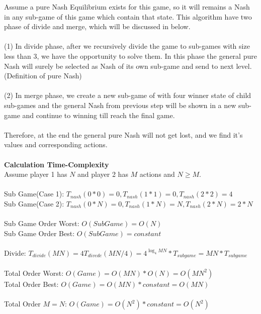 \documentclass[
  course = {{IE579 Game Theory and Multi-Agent Reinforcement Learning}},
  quartile = {{4}},
  assignment = 2,
  name = {{Mohammad Mahdi Rahimi}},
  studentnumber = {{20208244}},
  email = {{mahi@kaist.ac.kr}},
  firstexercise = 1
]{aga-homework}
\begin{document}
\proof Assume a pure Nash Equilibrium exists for this game, so it will remains a Nash in any sub-game of this game which contain that state. This algorithm have two phase of divide and merge, which will be discussed in below.\\\\
(1) In divide phase, after we recursively divide the game to sub-games with size less than 3, we have the opportunity to solve them. In this phase the general pure Nash will surely be selected as Nash of its own sub-game and send to next level. (Definition of pure Nash)
\\\\
(2) In merge phase, we create a new sub-game of with four winner state of child sub-games and the general Nash from previous step will be shown in a new sub-game and continue to winning till reach the final game.
\\\\
Therefore, at the end the general pure Nash will not get lost, and we find it's values and corresponding actions.
\\\\
\textbf{Calculation Time-Complexity}\\
Assume player 1 has $N$ and player 2 has $M$ actions and $N \ge M$.\\\\
Sub Game(Case 1): $T_{nash}(0*0) = 0, T_{nash}(1*1) = 0, T_{nash}(2*2) = 4$\\
Sub Game(Case 2): $T_{nash}(0*N) = 0, T_{nash}(1*N) = N, T_{nash}(2*N) = 2*N$\\
\\
Sub Game Order Worst: $O(SubGame) = O(N)$\\
Sub Game Order Best: $O(SubGame) = constant $\\\\
Divide: $T_{divide}(MN) = 4T_{divede}(MN/4) = 4^{\log_4{MN}}*T_{subgame} = MN*T_{subgame}$\\\\
Total Order Worst: $O(Game) =  O(MN) * O(N) = O(MN^2)$\\
Total Order Best: $O(Game) = O(MN) * constant = O(MN)$\\\\
Total Order $M = N$: $O(Game) = O(N^2) * constant = O(N^2)$\\\\
\end{document}
